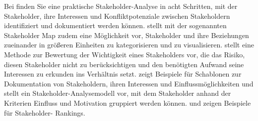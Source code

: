 Bei \cite[55 \psqq]{ebe22} finden 
Sie eine praktische Stakeholder-Analyse in acht Schritten, mit der Stakeholder, ihre Interessen und Konfliktpotenziale zwischen Stake\-holdern identifiziert und dokumentiert werden können. \cite[44 \psq]{rob13} stellt mit der sogenannten Stakeholder Map zudem eine Möglichkeit vor, Stakeholder und ihre Beziehungen zueinander in größeren Einheiten zu kategorisieren und zu visualisieren. \cite[48 \psq]{oes13} stellt eine Methode zur Bewertung der Wichtigkeit eines Stakeholders vor, die das Risiko, diesen Stakeholder nicht zu  berücksichtigen und den benötigten Aufwand seine Interessen zu erkunden ins Verhältnis setzt. \cite[81 \psqq]{rup14} zeigt Beispiele für Schablonen zur Dokumentation von Stakeholdern, \mbox{ihren} Interessen und Einflussmöglichkeiten und stellt ein Stakeholder-Analysemodell vor, mit dem Stake\-holder anhand der Kriterien Einfluss und Motivation gruppiert werden können. \cite[121]{lef11} und \cite[46 \psq]{lap17} zeigen Beispiele für Stakeholder-
\linebreak %
Rankings. 
